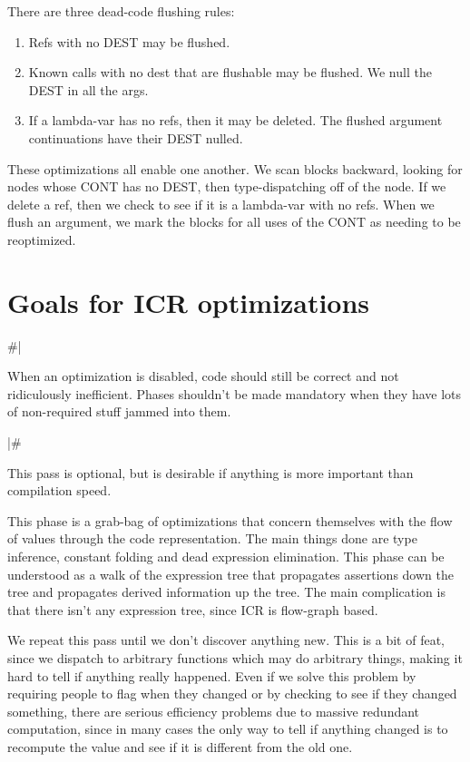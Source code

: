 There are three dead-code flushing rules:

\begin{enumerate}
\item Refs with no DEST may be flushed.

\item Known calls with no dest that are flushable may be flushed.  We null the
DEST in all the args.

\item If a lambda-var has no refs, then it may be deleted. The flushed
    argument continuations have their DEST nulled.
\end{enumerate}

These optimizations all enable one another.  We scan blocks backward, looking
for nodes whose CONT has no DEST, then type-dispatching off of the node.  If we
delete a ref, then we check to see if it is a lambda-var with no refs.  When we
flush an argument, we mark the blocks for all uses of the CONT as needing to be
reoptimized.

\section{Goals for ICR optimizations}

\#|

When an optimization is disabled, code should still be correct and not
ridiculously inefficient.  Phases shouldn't be made mandatory when they have
lots of non-required stuff jammed into them.

|\#

This pass is optional, but is desirable if anything is more important than
compilation speed.

This phase is a grab-bag of optimizations that concern themselves with the flow
of values through the code representation.  The main things done are type
inference, constant folding and dead expression elimination.  This phase can be
understood as a walk of the expression tree that propagates assertions down the
tree and propagates derived information up the tree.  The main complication is
that there isn't any expression tree, since ICR is flow-graph based.

We repeat this pass until we don't discover anything new.  This is a bit of
feat, since we dispatch to arbitrary functions which may do arbitrary things,
making it hard to tell if anything really happened.  Even if we solve this
problem by requiring people to flag when they changed or by checking to see if
they changed something, there are serious efficiency problems due to massive
redundant computation, since in many cases the only way to tell if anything
changed is to recompute the value and see if it is different from the old one.

